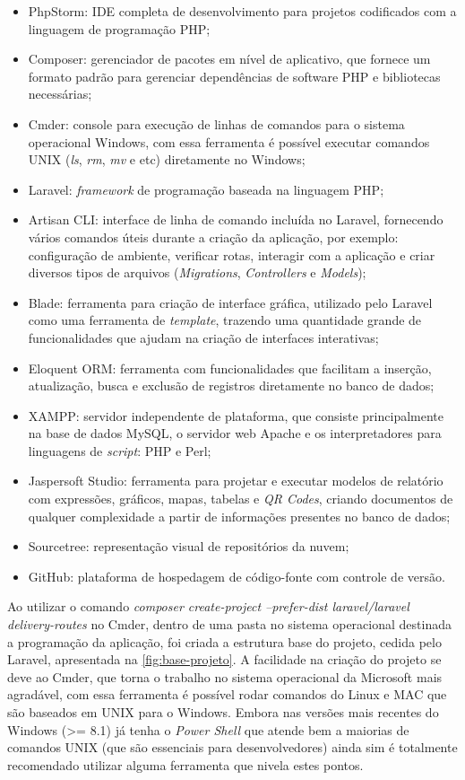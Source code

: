 \begin{itemize}
    \item PhpStorm: IDE completa de desenvolvimento para projetos codificados com a linguagem de programação PHP;
    \item Composer: gerenciador de pacotes em nível de aplicativo, que fornece um formato padrão para gerenciar dependências de software PHP e bibliotecas necessárias;
    \item Cmder: console para execução de linhas de comandos para o sistema operacional Windows, com essa ferramenta é possível executar comandos UNIX (\textit{ls}, \textit{rm}, \textit{mv} e etc) diretamente no Windows;
    \item Laravel: \textit{framework} de programação baseada na linguagem PHP;
    \item Artisan CLI: interface de linha de comando incluída no Laravel, fornecendo vários comandos úteis durante a criação da aplicação, por exemplo: configuração de ambiente, verificar rotas, interagir com a aplicação e criar diversos tipos de arquivos (\textit{Migrations}, \textit{Controllers} e \textit{Models});
    \item Blade: ferramenta para criação de interface gráfica, utilizado pelo Laravel como uma ferramenta de \textit{template}, trazendo uma quantidade grande de funcionalidades que ajudam na criação de interfaces interativas;
    \item Eloquent ORM: ferramenta com funcionalidades que facilitam a inserção, atualização, busca e exclusão de registros diretamente no banco de dados;
    \item XAMPP: servidor independente de plataforma, que consiste principalmente na base de dados MySQL, o servidor web Apache e os interpretadores para linguagens de \textit{script}: PHP e Perl;
    \item Jaspersoft Studio: ferramenta para projetar e executar modelos de relatório com  expressões, gráficos, mapas, tabelas e \textit{QR Codes}, criando documentos de qualquer complexidade a partir de informações presentes no banco de dados;
    \item Sourcetree: representação visual de repositórios da nuvem;
    \item GitHub: plataforma de hospedagem de código-fonte com controle de versão.
\end{itemize}

Ao utilizar o comando \textit{composer create-project --prefer-dist laravel/laravel delivery-routes} no Cmder, dentro de uma pasta no sistema operacional destinada a programação da aplicação, foi criada a estrutura base do projeto, cedida pelo Laravel, apresentada na \autoref{fig:base-projeto}. A facilidade na criação do projeto se deve ao Cmder, que torna o trabalho no sistema operacional da Microsoft mais agradável, com essa ferramenta é possível rodar comandos do Linux e MAC que são baseados em UNIX para o Windows. Embora nas versões mais recentes do Windows (>= 8.1) já tenha o \textit{Power Shell} que atende bem a maiorias de comandos UNIX (que são essenciais para desenvolvedores) ainda sim é totalmente recomendado utilizar alguma ferramenta que nivela estes pontos.

